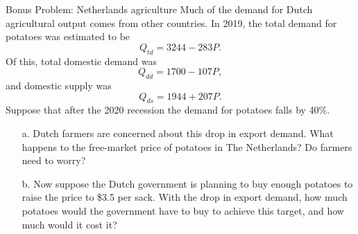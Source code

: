\documentclass[10pt]{beamer}
\begin{document}
\begin{frame}[t]{Bonus Problem: Netherlands agriculture}
  Much of the demand for Dutch agricultural output comes from other countries.
  In 2019, the total demand for potatoes was estimated to be
  \begin{equation*}
    Q_{td} = 3244 - 283 P.
  \end{equation*}
  Of this, total domestic demand was
  \begin{equation*}
    Q_{dd} = 1700 - 107 P,
  \end{equation*}
  and domestic supply was
  \begin{equation*}
    Q_{ds} = 1944 + 207 P.
  \end{equation*}
  Suppose that after the 2020 recession the demand for potatoes falls by 40\%.
\end{frame}

\begin{frame}[t]
  \begin{itemize}
    \item[a.] Dutch farmers are concerned about this drop in export demand.
    What happens to the free-market price of potatoes in The Netherlands? Do farmers need to worry? 
  \end{itemize}
\end{frame}

\begin{frame}[t]
  \begin{itemize}
    \item[b.] Now suppose the Dutch government is planning to buy enough potatoes to raise the price to \$3.5 per sack.
    With the drop in export demand, how much potatoes would the government have to buy to achieve this target, and how much would it cost it? 
  \end{itemize}
\end{frame}
\end{document}
